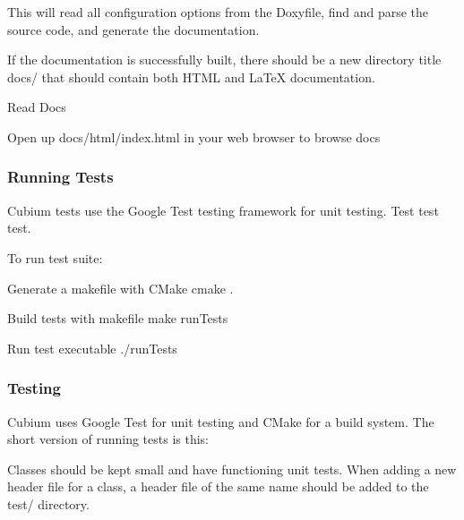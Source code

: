 This will read all configuration options from the Doxyfile, find and parse the source code, and generate the documentation.

If the documentation is successfully built, there should be a new directory title {\ttfamily docs/} that should contain both H\+T\+ML and La\+TeX documentation.


\begin{DoxyItemize}
\item Read Docs
\begin{DoxyItemize}
\item Open up {\ttfamily docs/html/index.\+html} in your web browser to browse docs
\end{DoxyItemize}
\end{DoxyItemize}

\subsubsection*{Running Tests}

Cubium tests use the Google Test testing framework for unit testing. Test test test.
\begin{DoxyItemize}
\item To run test suite\+:
\begin{DoxyItemize}
\item Generate a makefile with C\+Make {\ttfamily cmake .}
\item Build tests with makefile {\ttfamily make run\+Tests}
\item Run test executable {\ttfamily ./run\+Tests}
\end{DoxyItemize}
\end{DoxyItemize}

\subsubsection*{Testing}

Cubium uses Google Test for unit testing and C\+Make for a build system. The short version of running tests is this\+:

Classes should be kept small and have functioning unit tests. When adding a new header file for a class, a header file of the same name should be added to the {\ttfamily test/} directory.

